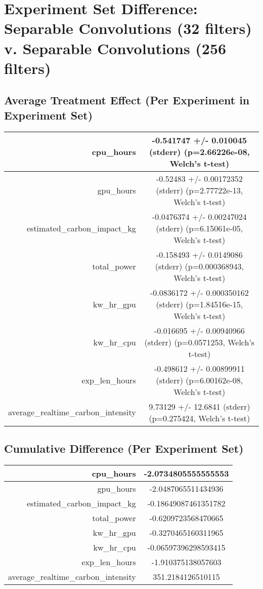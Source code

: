 \documentclass{article}%
\begin{document}
%
\normalsize%
\section{Experiment Set Difference: Separable Convolutions (32 filters) v. Separable Convolutions (256 filters)}%
\label{sec:Experiment Set Difference Separable Convolutions (32 filters) v. Separable Convolutions (256 filters)}%
\subsection{Average Treatment Effect (Per Experiment in Experiment Set)}%
\label{subsec:Average Treatment Effect (Per Experiment in Experiment Set)}%
\begin{tabular}{|r|c|}%
\hline%
cpu\_hours&{-}0.541747 +/{-} 0.010045 (stderr) (p=2.66226e{-}08, Welch's t{-}test)\\%
\hline%
gpu\_hours&{-}0.52483 +/{-} 0.00172352 (stderr) (p=2.77722e{-}13, Welch's t{-}test)\\%
\hline%
estimated\_carbon\_impact\_kg&{-}0.0476374 +/{-} 0.00247024 (stderr) (p=6.15061e{-}05, Welch's t{-}test)\\%
\hline%
total\_power&{-}0.158493 +/{-} 0.0149086 (stderr) (p=0.000368943, Welch's t{-}test)\\%
\hline%
kw\_hr\_gpu&{-}0.0836172 +/{-} 0.000350162 (stderr) (p=1.84516e{-}15, Welch's t{-}test)\\%
\hline%
kw\_hr\_cpu&{-}0.016695 +/{-} 0.00940966 (stderr) (p=0.0571253, Welch's t{-}test)\\%
\hline%
exp\_len\_hours&{-}0.498612 +/{-} 0.00899911 (stderr) (p=6.00162e{-}08, Welch's t{-}test)\\%
\hline%
average\_realtime\_carbon\_intensity&9.73129 +/{-} 12.6841 (stderr) (p=0.275424, Welch's t{-}test)\\%
\hline%
\end{tabular}

%
\subsection{Cumulative Difference (Per Experiment Set)}%
\label{subsec:Cumulative Difference (Per Experiment Set)}%
\begin{tabular}{|r|c|}%
\hline%
cpu\_hours&{-}2.0734805555555553\\%
\hline%
gpu\_hours&{-}2.0487065511434936\\%
\hline%
estimated\_carbon\_impact\_kg&{-}0.18649087461351782\\%
\hline%
total\_power&{-}0.6209723568470665\\%
\hline%
kw\_hr\_gpu&{-}0.3270465160311965\\%
\hline%
kw\_hr\_cpu&{-}0.06597396298593415\\%
\hline%
exp\_len\_hours&{-}1.910375138057603\\%
\hline%
average\_realtime\_carbon\_intensity&351.2184126510115\\%
\hline%
\end{tabular}

%
\end{document}
